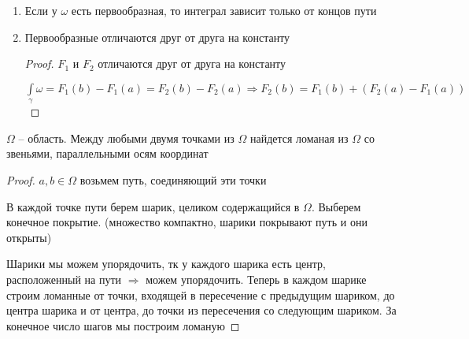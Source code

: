 \begin{consequence}\thmslashn

	\begin{enumerate}
		
		\item
		Если у $\omega$ есть первообразная, то интеграл зависит только от концов пути
		
		\item
		Первообразные отличаются друг от друга на константу
		
		\begin{proof}\thmslashn
			
			$F_1$ и $F_2$ отличаются друг от друга на константу
			
			$\int\limits_{\gamma} \omega = F_1(b) - F_1(a) = F_2(b) - F_2(a) \Rightarrow F_2(b) = F_1(b) + (F_2(a) - F_1(a))$
			
		\end{proof}
	
	\end{enumerate}

\end{consequence}

\begin{lemma}
	
	$\Omega$ -- область. Между любыми двумя точками из $\Omega$ найдется ломаная из $\Omega$ со звеньями, параллельными осям координат
	
\end{lemma}

\begin{proof}\thmslashn
	
	$a, b \in \Omega$ возьмем путь, соединяющий эти точки
	
	В каждой точке пути берем шарик, целиком содержащийся в $\Omega$. Выберем конечное покрытие. (множество компактно, шарики покрывают путь и они открыты)
	
	Шарики мы можем упорядочить, тк у каждого шарика есть центр, расположенный на пути $\Rightarrow$ можем упорядочить. Теперь в каждом шарике строим ломанные от точки, входящей в пересечение с предыдущим шариком, до центра шарика и от центра, до точки из пересечения со следующим шариком. За конечное число шагов мы построим ломаную 
	
\end{proof}

